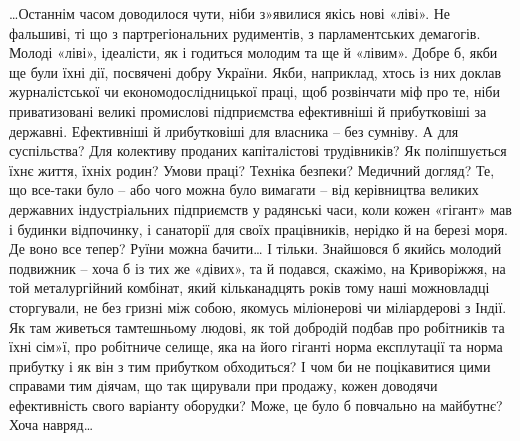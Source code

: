 \documentclass{kapital}
\begin{document}
	…Останнім часом доводилося чути, ніби з»явилися якісь нові «ліві». Не фальшиві, ті що з партрегіональних рудиментів, з парламентських демагогів. Молоді «ліві», ідеалісти, як і годиться молодим та ще й «лівим». Добре б, якби ще були їхні дії, посвячені добру України. Якби, наприклад, хтось із них доклав журналістської чи економодослідницької праці, щоб розвінчати міф про те, ніби приватизовані великі промислові підприємства ефективніші й прибутковіші за державні. Ефективніші й лрибутковіші для власника – без сумніву. А для суспільства? Для колективу проданих капіталістові трудівників? Як поліпшується їхнє життя, їхніх родин? Умови  праці? Техніка безпеки? Медичний догляд? Те, що все-таки було – або чого можна було вимагати – від керівництва великих державних індустріальних підприємств у радянські часи, коли кожен «гігант» мав і будинки відпочинку, і санаторії для своїх працівників, нерідко й на березі моря. Де воно все тепер? Руїни можна бачити… І тільки. Знайшовся б якийсь молодий подвижник – хоча б із тих же «дівих», та й подався, скажімо,  на Криворіжжя, на той металургійний комбінат, який кільканадцять років тому наші можновладці сторгували, не без гризні між собою, якомусь міліонерові чи міліардерові з Індії. Як там живеться тамтешньому людові, як той добродій подбав про робітників та їхні сім»ї, про робітниче селище, яка на його гіганті норма експлутації та норма прибутку і як він з тим прибутком обходиться? І чом би не поцікавитися цими справами тим діячам, що так щирували при продажу, кожен доводячи ефективність свого варіанту оборудки? Може, це було б повчально на майбутнє? Хоча навряд…         
 
\end{document}
